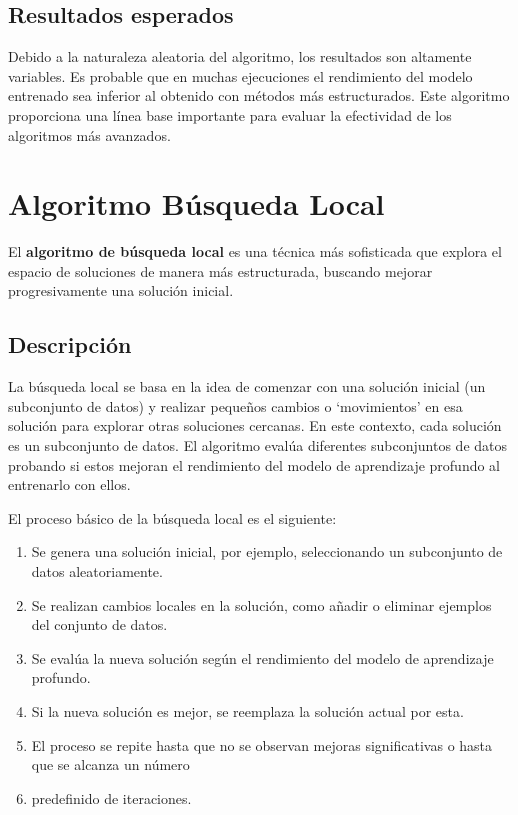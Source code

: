 \subsection{Resultados esperados}\label{subsec:resultados-esperados}
Debido a la naturaleza aleatoria del algoritmo, los resultados son altamente variables.
Es probable que en muchas ejecuciones el rendimiento del modelo entrenado sea inferior al obtenido con métodos más
estructurados.
Este algoritmo proporciona una línea base importante para evaluar la efectividad de los algoritmos más avanzados.


\section{Algoritmo Búsqueda Local}\label{sec:algoritmo-busqueda-local}
El \textbf{algoritmo de búsqueda local} es una técnica más sofisticada que explora el espacio de soluciones de manera
más estructurada, buscando mejorar progresivamente una solución inicial.

\subsection{Descripción}\label{subsec:descripcion2}
La búsqueda local se basa en la idea de comenzar con una solución inicial (un subconjunto de datos) y realizar pequeños
cambios o `movimientos' en esa solución para explorar otras soluciones cercanas.
En este contexto, cada solución es un subconjunto de datos.
El algoritmo evalúa diferentes subconjuntos de datos probando si estos mejoran el rendimiento del modelo de aprendizaje
profundo al entrenarlo con ellos.


El proceso básico de la búsqueda local es el siguiente:
\begin{enumerate}
      \item Se genera una solución inicial, por ejemplo, seleccionando un subconjunto de datos aleatoriamente.
      \item Se realizan cambios locales en la solución, como añadir o eliminar ejemplos del conjunto de datos.
      \item Se evalúa la nueva solución según el rendimiento del modelo de aprendizaje profundo.
      \item Si la nueva solución es mejor, se reemplaza la solución actual por esta.
      \item El proceso se repite hasta que no se observan mejoras significativas o hasta que se alcanza un número
      \item predefinido de iteraciones.
\end{enumerate}

